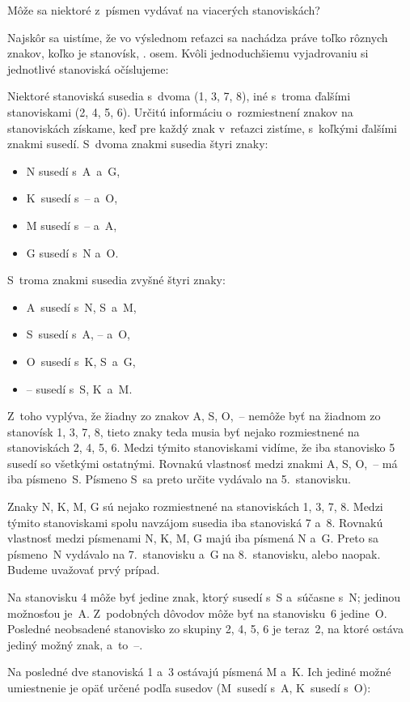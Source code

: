 {%
\napad
Môže sa niektoré z~písmen vydávať na viacerých stanoviskách?

\riesenie
Najskôr sa uistíme, že vo výslednom reťazci sa nachádza práve toľko rôznych znakov,
koľko je stanovísk, \tj. osem.
Kvôli jednoduchšiemu vyjadrovaniu si jednotlivé stanoviská očíslujeme:
%

Niektoré stanoviská susedia s~dvoma (1, 3, 7, 8), iné s~troma ďalšími
stanoviskami (2, 4, 5, 6).
Určitú informáciu o~rozmiestnení znakov na stanoviskách získame, keď pre každý
znak v~reťazci zistíme, s~koľkými ďalšími znakmi susedí.
S~dvoma znakmi susedia štyri znaky:
\begin{itemize}
\item N susedí s~A~a~G,
\item K~susedí s~-- a~O,
\item M susedí s~-- a~A,
\item G susedí s~N a~O.
\end{itemize}
\noindent
S~troma znakmi susedia zvyšné štyri znaky:
\begin{itemize}
\item A~susedí s~N, S~a~M,
\item S~susedí s~A, -- a~O,
\item O~susedí s~K, S~a~G,
\item -- susedí s~S, K~a~M.
\end{itemize}
Z~toho vyplýva, že žiadny zo znakov A, S, O,~-- nemôže byť na žiadnom zo
stanovísk 1, 3, 7, 8,
tieto znaky teda musia byť nejako rozmiestnené na stanoviskách 2, 4, 5, 6.
Medzi týmito stanoviskami vidíme, že iba stanovisko 5 susedí so všetkými
ostatnými.
Rovnakú vlastnosť medzi znakmi A, S, O,~-- má iba písmeno~S.
Písmeno S~sa preto určite vydávalo na 5.~stanovisku.
%

Znaky N, K, M, G sú nejako rozmiestnené na stanoviskách 1, 3, 7, 8.
Medzi týmito stanoviskami spolu navzájom susedia iba stanoviská 7 a~8.
Rovnakú vlastnosť medzi písmenami N, K, M, G majú iba písmená N a~G.
Preto sa písmeno~N vydávalo na 7.~stanovisku a~G na 8.~stanovisku, alebo
naopak. Budeme uvažovať prvý prípad.
%

Na stanovisku 4 môže byť jedine znak, ktorý susedí s~S a~súčasne s~N;
jedinou možnosťou je~A.
Z~podobných dôvodov môže byť na stanovisku~6 jedine~O.
Posledné neobsadené stanovisko zo skupiny 2, 4, 5, 6 je teraz~2, na ktoré
ostáva jediný možný znak, a~to~--.

Na posledné dve stanoviská 1 a~3 ostávajú písmená M a~K.
Ich jediné možné umiestnenie je opäť určené podľa susedov
(M~susedí s~A, K~susedí s~O):
%

}
